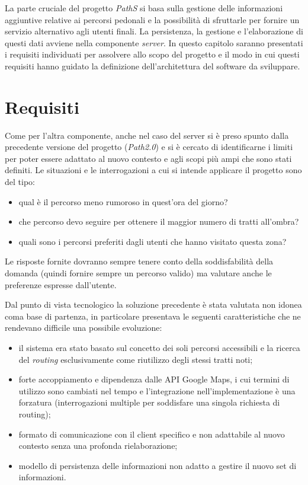 La parte cruciale del progetto \emph{PathS} si basa sulla gestione delle informazioni aggiuntive relative ai percorsi pedonali e la possibilità di sfruttarle per fornire un servizio alternativo agli utenti finali. La persistenza, la gestione e l'elaborazione di questi dati avviene nella componente \emph{server}. 
In questo capitolo saranno presentati i requisiti individuati per assolvere allo scopo del progetto e il modo in cui questi requisiti hanno guidato la definizione dell'architettura del software da sviluppare.

\section{Requisiti}
Come per l'altra componente, anche nel caso del server si è preso spunto dalla precedente versione del progetto (\emph{Path2.0}) e si è cercato di identificarne i limiti per poter essere adattato al nuovo contesto e agli scopi più ampi che sono stati definiti. Le situazioni e le interrogazioni a cui si intende applicare il progetto sono del tipo:
\begin{itemize}
\item qual è il percorso meno rumoroso in quest’ora del giorno?
\item che percorso devo seguire per ottenere il maggior numero di tratti all’ombra?
\item quali sono i percorsi preferiti dagli utenti che hanno visitato questa zona?
\end{itemize}
Le risposte fornite dovranno sempre tenere conto della soddisfabilità della domanda (quindi fornire sempre un percorso valido) ma valutare anche le preferenze espresse dall’utente.

Dal punto di vista tecnologico la soluzione precedente è stata valutata non idonea coma base di partenza, in particolare presentava le seguenti caratteristiche che ne rendevano difficile una possibile evoluzione:
\begin{itemize}
\item il sistema era stato basato sul concetto dei soli percorsi accessibili e la ricerca del \emph{routing} esclusivamente come riutilizzo degli stessi tratti noti;
\item forte accoppiamento e dipendenza dalle API Google Maps, i cui termini di utilizzo sono cambiati nel tempo e l'integrazione nell'implementazione è una forzatura (interrogazioni multiple per soddisfare una singola richiesta di routing);
\item formato di comunicazione con il client specifico e non adattabile al nuovo contesto senza una profonda rielaborazione;
\item modello di persistenza delle informazioni non adatto a gestire il nuovo set di informazioni.
\end{itemize}

